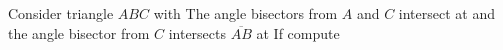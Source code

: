 Consider triangle $ABC$ with   The angle bisectors from $A$ and $C$ intersect at  and the angle bisector from $C$ intersects $\overline{AB}$ at   If  compute 